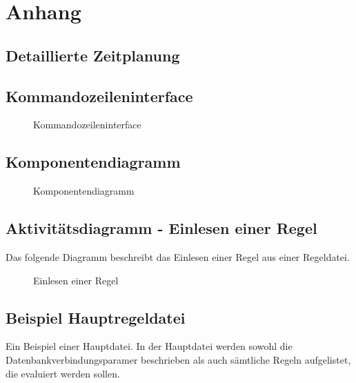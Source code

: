 \section{Anhang}
\subsection{Detaillierte Zeitplanung}
\label{app:Zeitplanung}





\clearpage

\subsection{Kommandozeileninterface}
\label{app:cli}
\begin{figure}[htb]
\centering
{}
\caption{Kommandozeileninterface}
\end{figure}
\clearpage

\subsection{Komponentendiagramm}
\label{app:Komponentendiagramm}
\begin{figure}[htb]
\centering
{}
\caption{Komponentendiagramm}
\end{figure}
\clearpage

\subsection{Aktivitätsdiagramm - Einlesen einer Regel}
\label{app:AktivitaetRegelEinlesen}
Das folgende Diagramm beschreibt das Einlesen einer Regel aus einer Regeldatei.
\begin{figure}[htb]
\centering
{}
\caption{Einlesen einer Regel}
\end{figure}
\clearpage

\subsection{Beispiel Hauptregeldatei}
\label{app:MasterDatei}
Ein Beispiel einer Hauptdatei. In der Hauptdatei werden sowohl die Datenbankverbindungsparamer beschrieben als auch sämtliche Regeln aufgelistet, die evaluiert werden sollen.


